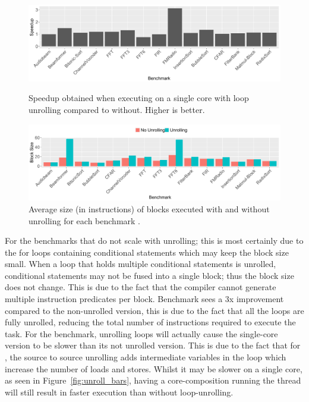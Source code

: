 \begin{figure}[t]
  \includegraphics[width=1\textwidth]{streamit-paper/graphics/unroll_speed_bars.pdf}
   \vspace{-2em}
 \caption{Speedup obtained when executing on a single core with loop unrolling compared to without. Higher is better.}\label{fig:unroll_bars}
\vspace{-0.5em}
  \includegraphics[width=1\textwidth]{streamit-paper/graphics/unrolling_size.pdf}  \vspace{-2em}

  \caption{Average size (in instructions) of blocks executed with and without unrolling for each benchmark .}\label{fig:unroll_size}  \vspace{-1em}

\end{figure}
For the benchmarks that do not scale with unrolling; this is most certainly due to the for loops containing conditional statements which may keep the block size small.
When a loop that holds multiple conditional statements is unrolled, conditional statements may not be fused into a single block; thus the block size does not change.
This is due to the fact that the compiler cannot generate multiple instruction predicates per block.
Benchmark  sees a 3x improvement compared to the non-unrolled version, this is due to the fact that all the loops are fully unrolled, reducing the total number of instructions required to execute the task.
For the  benchmark, unrolling loops will actually cause the single-core version to be slower than its not unrolled version.
This is due to the fact that for , the source to source unrolling adds intermediate variables in the loop which increase the number of loads and stores.
Whilst it may be slower on a single core, as seen in Figure~\ref{fig:unroll_bars}, having a core-composition running the thread will still result in faster execution than without loop-unrolling.

